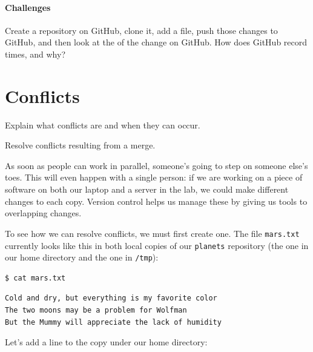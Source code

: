 \documentclass{book}
\begin{document}
\mbox{}\paragraph{Challenges}

\begin{swcenumerate}
\item
  Create a repository on GitHub, clone it, add a file, push those
  changes to GitHub, and then look at the
   of the change on GitHub. How does
  GitHub record times, and why?
\end{swcenumerate}

\section{Conflicts}

\begin{objectives}
\begin{swcitemize}
\item
  Explain what conflicts are and when they can occur.
\item
  Resolve conflicts resulting from a merge.
\end{swcitemize}
\end{objectives}

As soon as people can work in parallel, someone's going to step on
someone else's toes. This will even happen with a single person: if we
are working on a piece of software on both our laptop and a server in
the lab, we could make different changes to each copy. Version control
helps us manage these  by giving us
tools to  overlapping changes.

To see how we can resolve conflicts, we must first create one. The file
\texttt{mars.txt} currently looks like this in both local copies of our
\texttt{planets} repository (the one in our home directory and the one
in \texttt{/tmp}):

\begin{verbatim}
$ cat mars.txt
\end{verbatim}

\begin{verbatim}
Cold and dry, but everything is my favorite color
The two moons may be a problem for Wolfman
But the Mummy will appreciate the lack of humidity
\end{verbatim}

Let's add a line to the copy under our home directory:
\end{document}
